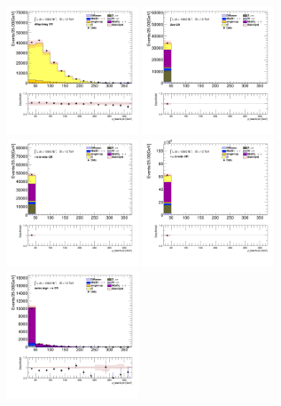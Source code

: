 		\begin{figure}[!htp]
			\begin{center}    
			\includegraphics[width=0.35\textwidth]{chapters/chapter6_HPlus/images/taulep/bjet_0_pt_DILEP_BTAG.png}
			\includegraphics[width=0.35\textwidth]{chapters/chapter6_HPlus/images/taulep/bjet_0_pt_ZEE.png} \\
			\includegraphics[width=0.35\textwidth]{chapters/chapter6_HPlus/images/taulep/bjet_0_pt_TAUEL_BVETO.png} 
			\includegraphics[width=0.35\textwidth]{chapters/chapter6_HPlus/images/taulep/bjet_0_pt_TAUMU_BVETO.png} \\
			\includegraphics[width=0.35\textwidth]{chapters/chapter6_HPlus/images/taulep/bjet_0_pt_SS_TAUEL.png} 

\end{center}
\end{figure}
